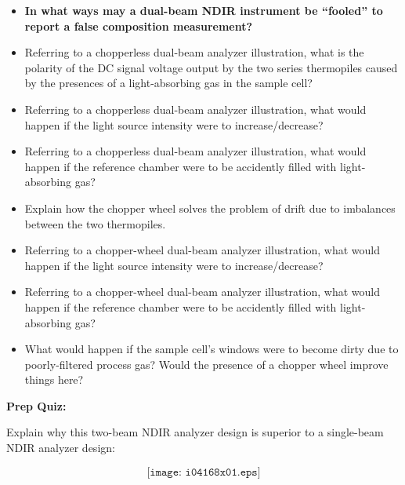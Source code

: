 \begin{itemize}
\item{} {\bf In what ways may a dual-beam NDIR instrument be ``fooled'' to report a false composition measurement?}
\item{} Referring to a chopperless dual-beam analyzer illustration, what is the polarity of the DC signal voltage output by the two series thermopiles caused by the presences of a light-absorbing gas in the sample cell?
\item{} Referring to a chopperless dual-beam analyzer illustration, what would happen if the light source intensity were to increase/decrease?
\item{} Referring to a chopperless dual-beam analyzer illustration, what would happen if the reference chamber were to be accidently filled with light-absorbing gas?
\item{} Explain how the chopper wheel solves the problem of drift due to imbalances between the two thermopiles.
\item{} Referring to a chopper-wheel dual-beam analyzer illustration, what would happen if the light source intensity were to increase/decrease?
\item{} Referring to a chopper-wheel dual-beam analyzer illustration, what would happen if the reference chamber were to be accidently filled with light-absorbing gas?
\item{} What would happen if the sample cell's windows were to become dirty due to poorly-filtered process gas?  Would the presence of a chopper wheel improve things here?
\end{itemize}






\vfil \eject

\noindent
{\bf Prep Quiz:}

Explain why this two-beam NDIR analyzer design is superior to a single-beam NDIR analyzer design:

$$\texttt{[image: i04168x01.eps]}$$




